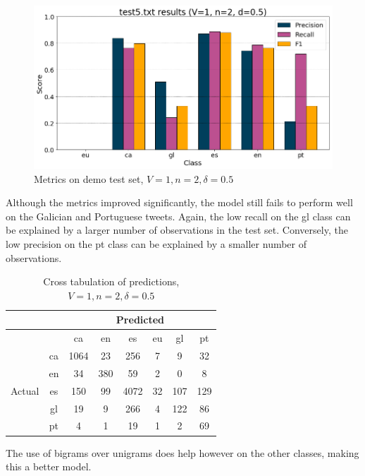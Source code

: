 \documentclass[runningheads]{llncs}
\begin{document}
\begin{figure}
    \begin{center}
        \includegraphics[width=12.5cm]{images/test5_results_1_2_0.5.png}
        \caption{Metrics on demo test set, $V=1, n=2, \delta=0.5$}
        \label{fig:demo_1_2_0.5}
    \end{center}
\end{figure}

Although the metrics improved significantly, the model still fails to perform well on the Galician and Portuguese tweets. Again, the low recall on the gl class can be explained by a larger number of observations in the test set. Conversely, the low precision on the pt class can be explained by a smaller number of observations.

\begin{table}
	\centering
	\caption{Cross tabulation of predictions, $V=1, n=2, \delta=0.5$}
	\label{tab:demo_confusion_1_2_0.5}
	\begin{tabular}{|c|c|c|c|c|c|c|c|} \hline
	    & & \multicolumn{6}{c|}{Predicted} \\ \hline
		& &    ca &   en &    es &  eu &   gl &   pt \\ \hline
		\multirow{6}{*}{Actual} & ca   &  1064 &   23 &   256 &   7 &    9 &   32 \\
		& en   &    34 &  380 &    59 &   2 &    0 &    8 \\
		& es   &   150 &   99 &  4072 &  32 &  107 &  129 \\
		& gl   &    19 &    9 &   266 &   4 &  122 &   86 \\
		& pt   &     4 &    1 &    19 &   1 &    2 &   69 \\ \hline
	\end{tabular}
\end{table}

The use of bigrams over unigrams does help however on the other classes, making this a better model.
\end{document}
